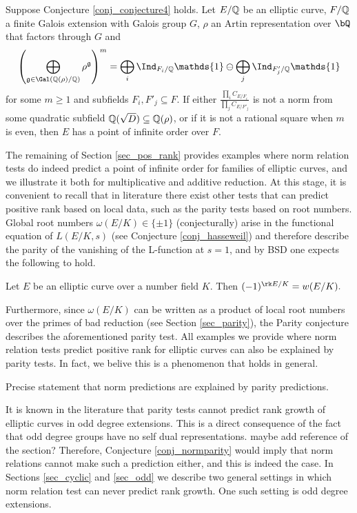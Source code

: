 \begin{thm}\cite[Theorem 33]{DEW1}
    Suppose Conjecture \ref{conj_conjecture4} holds. Let $E/\mathbb{Q}$ be an elliptic curve, $F/\mathbb{Q}$ a finite Galois extension with Galois group $G$, $\rho$ an Artin representation over $\bQ$ that factors through $G$ and 
    $$\left(\bigoplus_{\mathfrak{g}\in\Gal(\QQ(\rho)/\QQ)}\rho^{\mathfrak{g}}\right)^m=\bigoplus_i\Ind_{F_i/\QQ}\mathds{1}\ominus\bigoplus_j\Ind_{F'_j/\QQ}\mathds{1}$$
    for some $m\geq 1$ and subfields $F_i,F'_j\subseteq F$. If either $\frac{\prod_i C_{E/F_i}}{\prod_j C_{E/F'_j}}$ is not a norm from some quadratic subfield $\mathbb{Q}(\sqrt{D})\subseteq\mathbb{Q}(\rho)$, or if it is not a rational square when $m$ is even, then $E$ has a point of infinite order over $F$.
\end{thm}

The remaining of Section \ref{sec_pos_rank} provides examples where norm relation tests do indeed predict a point of infinite order for families of elliptic curves, and we illustrate it both for multiplicative and additive reduction. At this stage, it is convenient to recall that in literature there exist other tests that can predict positive rank based on local data, such as the parity tests based on root numbers. Global root numbers $\omega(E/K)\in\{\pm1\}$ (conjecturally) arise in the functional equation of $L(E/K,s)$ (see Conjecture \ref{conj_hasseweil}) and therefore describe the parity of the vanishing of the L-function at $s=1$, and by BSD one expects the following to hold.

\begin{conj}%
    Let $E$ be an elliptic curve over a number field $K$. Then
    $(-1)^{\rk E / K} = w(E / K).$
\end{conj}

Furthermore, since $\omega(E/K)$ can be written as a product of local root numbers over the primes of bad reduction (see Section \ref{sec_parity}), the Parity conjecture describes the aforementioned parity test. All examples we provide where norm relation tests predict positive rank for elliptic curves can also be explained by parity tests. In fact, we belive this is a phenomenon that holds in general.

\begin{conj}\label{conj_normparity}
    {\color{red} Precise statement that norm predictions are explained by parity predictions.}
\end{conj}

It is known in the literature that parity tests cannot predict rank growth of elliptic curves in odd degree extensions. This is a direct consequence of the fact that odd degree groups have no self dual representations. {\color{red} maybe add reference of the section?} Therefore, Conjecture \ref{conj_normparity} would imply that norm relations cannot make such a prediction either, and this is indeed the case. In Sections \ref{sec_cyclic} and \ref{sec_odd} we describe two general settings in which norm relation test can never predict rank growth. One such setting is odd degree extensions.

